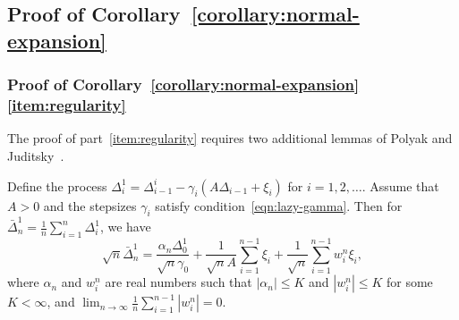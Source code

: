 
\subsection{Proof of Corollary~\ref{corollary:normal-expansion}}
\label{proof:normal-expansion}

\subsubsection*{Proof of
  Corollary~\ref{corollary:normal-expansion}\eqref{item:regularity}}

The proof of part~\eqref{item:regularity} requires two additional lemmas of
Polyak and Juditsky~\cite{PolyakJu92}.
\begin{lem}
  \label{lemma:polyak-expansion}
  Define the process $\Delta_i^1 = \Delta_{i-1}^i
  - \gamma_i (A \Delta_{i-1} + \xi_i)$ for $i = 1, 2, \ldots$.
  Assume that $A>0$ and the stepsizes $\gamma_i$ satisfy
  condition~\eqref{eqn:lazy-gamma}. Then
  for $\bar{\Delta}_n^1 = \frac{1}{n} \sum_{i = 1}^n \Delta_i^1$, we have
  \begin{equation}
    \label{eqn:polyak-expansion}
    \sqrt{n} \bar{\Delta}_n^1
    = \frac{\alpha_n \Delta_0^1}{\sqrt{n} \gamma_0}
    + \frac{1}{\sqrt{n} A} \sum_{i=1}^{n-1} \xi_i
    + \frac{1}{\sqrt{n}}\sum_{i=1}^{n-1} w_i^n \xi_i,
  \end{equation}
  where $\alpha_n$ and $w_i^n$ are real numbers such that $|\alpha_n| \leq
  K$ and $|w_i^n|\leq K$ for some $K< \infty$, and $\lim_{n\to \infty}
  \frac{1}{n} \sum_{i=1}^{n-1} |w_i^n| = 0$.
\end{lem} 

